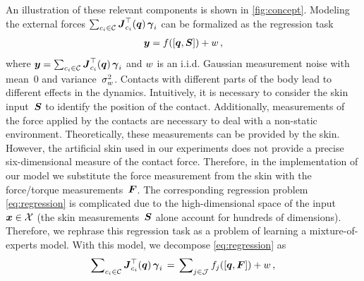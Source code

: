     An illustration of these relevant components is shown in \fig\ref{fig:concept}.
	Modeling the external forces $\sum_{c_i \in\mathcal{C}} {\boldsymbol J^\top_{c_i}(\boldsymbol q)}\, \boldsymbol{\gamma}_i$ can be formalized as the regression task
	\begin{align}
		\boldsymbol y = f([\boldsymbol q, \mathcal{\boldsymbol{S}}]) + w\,,
		\label{eq:regression}
	\end{align}
	where $\boldsymbol y = \sum_{c_i \in\mathcal{C}} {\boldsymbol J^\top_{c_i}(\boldsymbol q)}\, \boldsymbol{\gamma}_i$ and  
	$w$ is an i.i.d. Gaussian measurement noise with mean~$0$ and variance~$\sigma_w^2$.
    Contacts with different parts of the body lead to different effects in the dynamics.
    Intuitively, it is necessary to consider the skin input~$\mathcal{\boldsymbol{S}}$ to identify the position of the contact.
    Additionally, measurements of the force applied by the contacts are necessary to deal with a non-static environment.
    Theoretically, these measurements can be provided by the skin.
    However, the artificial skin used in our experiments does not provide a precise six-dimensional measure of the contact force.
	Therefore, in the implementation of our model we substitute the force measurement from the skin with the force/torque measurements~$\boldsymbol{F}$.
    The corresponding regression problem \eq\eqref{eq:regression} is complicated due to the high-dimensional space of the input $\boldsymbol x \in \mathcal{X}$ (the skin measurements~$\mathcal{\boldsymbol{S}}$ alone account for hundreds of dimensions).
	Therefore, we rephrase this regression task as a problem of learning a mixture-of-experts model.
	With this model, we decompose \eq\eqref{eq:regression} as
	\begin{align}
		\sum\nolimits_{c_i \in\mathcal{C}} {\boldsymbol J^\top_{c_i}(\boldsymbol q)}\, \boldsymbol{\gamma}_i \,=\, \sum\nolimits_{j\in\mathcal{J}} f_j([\boldsymbol q, \boldsymbol{F}]) + w\,,
		\label{eq:expertofmixtureregression}
	\end{align}
